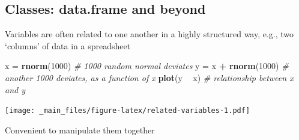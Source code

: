 \documentclass[]{article}
\newenvironment{Shaded}{\begin{snugshade}}{\end{snugshade}}
\newcommand{\KeywordTok}[1]{\textcolor[rgb]{0.13,0.29,0.53}{\textbf{#1}}}
\newcommand{\DecValTok}[1]{\textcolor[rgb]{0.00,0.00,0.81}{#1}}
\newcommand{\StringTok}[1]{\textcolor[rgb]{0.31,0.60,0.02}{#1}}
\newcommand{\CommentTok}[1]{\textcolor[rgb]{0.56,0.35,0.01}{\textit{#1}}}
\newcommand{\OperatorTok}[1]{\textcolor[rgb]{0.81,0.36,0.00}{\textbf{#1}}}
\newcommand{\NormalTok}[1]{#1}
\theoremstyle{definition}
\theoremstyle{definition}
\theoremstyle{remark}
\begin{document}
\subsection{Classes: data.frame and
beyond}\label{classes-data.frame-and-beyond}

Variables are often related to one another in a highly structured way,
e.g., two `columns' of data in a spreadsheet

\begin{Shaded}
\begin{Highlighting}[]
\NormalTok{x =}\StringTok{ }\KeywordTok{rnorm}\NormalTok{(}\DecValTok{1000}\NormalTok{)       }\CommentTok{# 1000 random normal deviates}
\NormalTok{y =}\StringTok{ }\NormalTok{x }\OperatorTok{+}\StringTok{ }\KeywordTok{rnorm}\NormalTok{(}\DecValTok{1000}\NormalTok{)   }\CommentTok{# another 1000 deviates, as a function of x}
\KeywordTok{plot}\NormalTok{(y }\OperatorTok{~}\StringTok{ }\NormalTok{x)           }\CommentTok{# relationship between x and y}
\end{Highlighting}
\end{Shaded}

\texttt{[image: \_main\_files/figure-latex/related-variables-1.pdf]}

Convenient to manipulate them together
\end{document}

